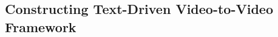 \documentclass[runningheads]{llncs}
\begin{document}



\subsection{Constructing Text-Driven Video-to-Video Framework}
\label{sec:v2v_network}
\end{document}

